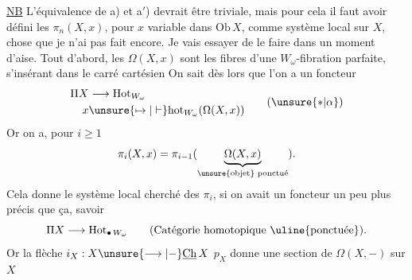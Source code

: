 \uline{NB} L'équivalence de a) et a$'$) devrait être triviale, mais pour cela il faut avoir défini les $\pi_n(X,x)$, pour $x$ variable dans $\mathrm{Ob}\,X$, comme système local sur $X$, chose que je n'ai pas fait encore. Je vais essayer de le faire dans un moment d'aise. 
Tout d'abord, les $\Omega(X,x)$ sont les fibres d'une $W_\omega$-fibration parfaite, s'insérant dans le carré cartésien
On sait dès lors que l'on a un foncteur
\[
\begin{aligned}
\Pi X&\longrightarrow\mathrm{Hot}_{W_\omega}\\
x&\unsure{\mapsto|\vdash}\mathrm{hot}_{W_\omega}(\Omega(X,x))
\end{aligned}
\tag*{($\unsure{*|\alpha}$)}
\]
Or on a, pour $i\geq1$
\[
\pi_i(X,x)=\pi_{i-1}(\underbrace{\Omega(X,x)}_{\text{\unsure{objet} ponctué}}).
\]
Cela donne le système local cherché des $\pi_i$, si  on avait un foncteur un peu plus précis que ça, savoir
\[
\Pi X\longrightarrow\mathrm{Hot}_{\bullet\,W_\omega}
\qquad\text{(Catégorie homotopique \uline{ponctuée}).}
\]
Or la  flèche $i_X:X\unsure{\longrightarrow|-}\underline{\mathrm{Ch}}\,X$  $p_X$ donne une section  de $\Omega(X,-)$ sur $X$ \textendash
